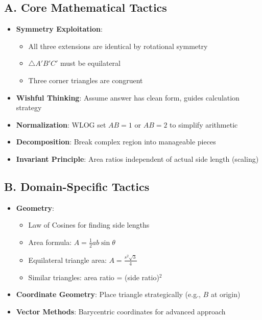 \documentclass[11pt]{article}
\begin{document}
\begin{tacticalbox}
\subsection*{A. Core Mathematical Tactics}
\begin{itemize}[leftmargin=*]
    \item \textbf{Symmetry Exploitation}: 
    \begin{itemize}
        \item All three extensions are identical by rotational symmetry
        \item $\triangle A'B'C'$ must be equilateral
        \item Three corner triangles are congruent
    \end{itemize}
    \item \textbf{Wishful Thinking}: Assume answer has clean form, guides calculation strategy
    \item \textbf{Normalization}: WLOG set $AB = 1$ or $AB = 2$ to simplify arithmetic
    \item \textbf{Decomposition}: Break complex region into manageable pieces
    \item \textbf{Invariant Principle}: Area ratios independent of actual side length (scaling)
\end{itemize}

\subsection*{B. Domain-Specific Tactics}
\begin{itemize}[leftmargin=*]
    \item \textbf{Geometry}: 
    \begin{itemize}
        \item Law of Cosines for finding side lengths
        \item Area formula: $A = \frac{1}{2}ab\sin\theta$
        \item Equilateral triangle area: $A = \frac{s^2\sqrt{3}}{4}$
        \item Similar triangles: area ratio = (side ratio)$^2$
    \end{itemize}
    \item \textbf{Coordinate Geometry}: Place triangle strategically (e.g., $B$ at origin)
    \item \textbf{Vector Methods}: Barycentric coordinates for advanced approach
\end{itemize}
\end{tacticalbox}
\end{document}
